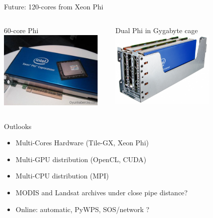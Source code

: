 \documentclass[xcolor=dvipsnames,beamer]{beamer} %
\begin{document}
\begin{frame}[fragile]{Future: 120-cores from Xeon Phi}

\begin{columns}[l]
\begin{center}
 60-core Phi\newline\linebreak
 \includegraphics[width=5cm]{xeon-phi-oh}
\end{center}
\begin{center}
 Dual Phi in Gygabyte cage\newline\linebreak
 \includegraphics[width=5cm]{Gigabyte-GS-R22PHL-Xeon-Phi-Cage-600x440}
\end{center}

\end{columns}

\end{frame}

\begin{frame}[fragile]{Outlooks}

\begin{itemize}
 \item Multi-Cores Hardware (Tile-GX, Xeon Phi)
 \item Multi-GPU distribution (OpenCL, CUDA)
 \item Multi-CPU distribution (MPI)
 \item MODIS and Landsat archives under close pipe distance?
 \item Online: automatic, PyWPS, SOS/network ? 
\end{itemize}

\end{frame}
\end{document}
